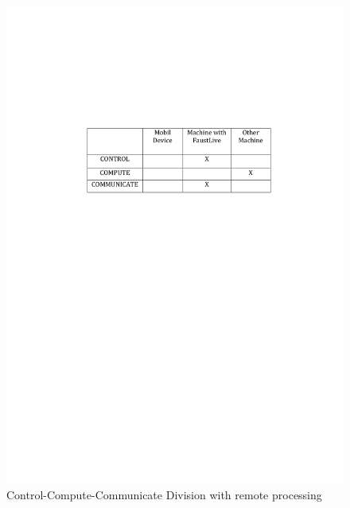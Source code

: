 \documentclass[a4paper]{article}
\begin{document}
\begin{figure}[!h]
\begin{center}
\includegraphics[width=0.7\columnwidth]{images/4CCC}
\caption{Control-Compute-Communicate Division with remote processing}
\label{fig:4CCC}
\end{center}
\end{figure}
\end{document}
